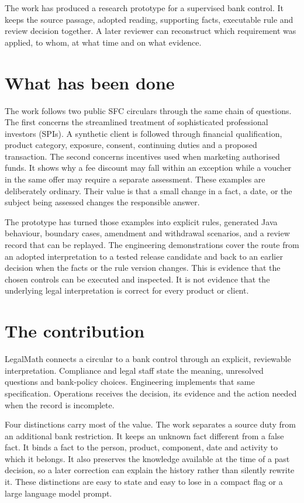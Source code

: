 \documentclass[12pt,a4paper,oneside,openany]{book}
\begin{document}
The work has produced a research prototype for a supervised bank control. It
keeps the source passage, adopted reading, supporting facts, executable rule and
review decision together. A later reviewer can reconstruct which requirement
was applied, to whom, at what time and on what evidence.

\section*{What has been done}

The work follows two public SFC circulars through the same chain of questions.
The first concerns the streamlined treatment of sophisticated professional
investors (SPIs). A synthetic client is followed through financial qualification,
product category, exposure, consent, continuing duties and a proposed
transaction. The second concerns incentives used when marketing authorised
funds. It shows why a fee discount may fall within an exception while a voucher
in the same offer may require a separate assessment. These examples are
deliberately ordinary. Their value is that a small change in a fact, a date, or
the subject being assessed changes the responsible answer.

The prototype has turned those examples into explicit rules, generated Java
behaviour, boundary cases, amendment and withdrawal scenarios, and a review
record that can be replayed. The engineering demonstrations cover the route from
an adopted interpretation to a tested release candidate and back to an earlier
decision when the facts or the rule version changes. This is evidence that the
chosen controls can be executed and inspected. It is not evidence that the
underlying legal interpretation is correct for every product or client.

\section*{The contribution}

LegalMath connects a circular to a bank control through an explicit, reviewable
interpretation. Compliance and legal staff state the meaning, unresolved
questions and bank-policy choices. Engineering implements that same
specification. Operations receives the decision, its evidence and the action
needed when the record is incomplete.

\newpage
Four distinctions carry most of the value. The work separates a source duty
from an additional bank restriction. It keeps an unknown fact different from a
false fact. It binds a fact to the person, product, component, date and activity
to which it belongs. It also preserves the knowledge available at the time of a
past decision, so a later correction can explain the history rather than silently
rewrite it. These distinctions are easy to state and easy to lose in a compact
flag or a large language model prompt.
\end{document}
